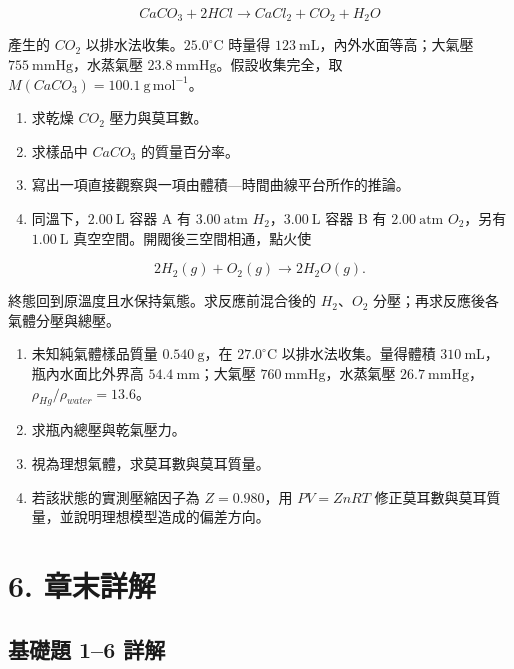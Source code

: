 \documentclass[11pt,a4paper]{article}
\begin{document}
\[
   CaCO_3+2HCl\rightarrow CaCl_2+CO_2+H_2O
   \]

產生的 \(CO_2\) 以排水法收集。\(25.0^\circ\mathrm C\) 時量得 \(123\ \mathrm{mL}\)，內外水面等高；大氣壓 \(755\ \mathrm{mmHg}\)，水蒸氣壓 \(23.8\ \mathrm{mmHg}\)。假設收集完全，取 \(M(CaCO_3)=100.1\ \mathrm{g\,mol^{-1}}\)。

\begin{enumerate}
\def\labelenumi{\arabic{enumi}.}
\item
  求乾燥 \(CO_2\) 壓力與莫耳數。
\item
  求樣品中 \(CaCO_3\) 的質量百分率。
\item
  寫出一項直接觀察與一項由體積---時間曲線平台所作的推論。
\item
  同溫下，\(2.00\ \mathrm L\) 容器 A 有 \(3.00\ \mathrm{atm}\) \(H_2\)，\(3.00\ \mathrm L\) 容器 B 有 \(2.00\ \mathrm{atm}\) \(O_2\)，另有 \(1.00\ \mathrm L\) 真空空間。開閥後三空間相通，點火使
\end{enumerate}

\[
   2H_2(g)+O_2(g)\rightarrow2H_2O(g).
   \]

終態回到原溫度且水保持氣態。求反應前混合後的 \(H_2\)、\(O_2\) 分壓；再求反應後各氣體分壓與總壓。

\begin{enumerate}
\def\labelenumi{\arabic{enumi}.}
\setcounter{enumi}{15}
\item
  未知純氣體樣品質量 \(0.540\ \mathrm g\)，在 \(27.0^\circ\mathrm C\) 以排水法收集。量得體積 \(310\ \mathrm{mL}\)，瓶內水面比外界高 \(54.4\ \mathrm{mm}\)；大氣壓 \(760\ \mathrm{mmHg}\)，水蒸氣壓 \(26.7\ \mathrm{mmHg}\)，\(\rho_{Hg}/\rho_{water}=13.6\)。
\item
  求瓶內總壓與乾氣壓力。
\item
  視為理想氣體，求莫耳數與莫耳質量。
\item
  若該狀態的實測壓縮因子為 \(Z=0.980\)，用 \(PV=ZnRT\) 修正莫耳數與莫耳質量，並說明理想模型造成的偏差方向。
\end{enumerate}

\section{6. 章末詳解}\label{ux7ae0ux672bux8a73ux89e3}

\subsection{基礎題 1--6 詳解}\label{ux57faux790eux984c-16-ux8a73ux89e3}
\end{document}
